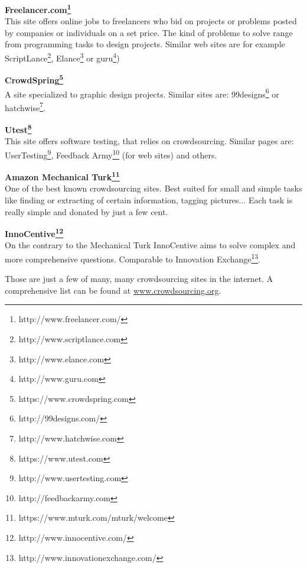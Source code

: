 \documentclass{acm_proc_article-sp}
\begin{document}
\textbf{Freelancer.com\footnote{http://www.freelancer.com/}}\\
This site offers online jobs to freelancers who bid on projects or problems posted by companies or individuals on a set price. The kind of problems to solve range from programming tasks to design projects. Similar web sites are for example ScriptLance\footnote{http://www.scriptlance.com}, Elance\footnote{http://www.elance.com} or guru\footnote{http://www.guru.com})

\textbf{CrowdSpring\footnote{https://www.crowdspring.com}}\\
A site specialized to graphic design projects. Similar sites are: 99designs\footnote{http://99designs.com/} or hatchwise\footnote{http://www.hatchwise.com}.

\textbf{Utest\footnote{https://www.utest.com}}\\
This site offers software testing, that relies on crowdsourcing. Similar pages are: UserTesting\footnote{http://www.usertesting.com}, Feedback Army\footnote{http://feedbackarmy.com} (for web sites) and others.

\textbf{Amazon Mechanical Turk\footnote{https://www.mturk.com/mturk/welcome}}\\
One of the best known crowdsourcing sites. Best suited for small and simple tasks like finding or extracting of certain information, tagging pictures... Each task is really simple and donated by just a few cent.

\textbf{InnoCentive\footnote{http://www.innocentive.com/}}\\
On the contrary to the Mechanical Turk InnoCentive aims to solve complex and more comprehensive questions. Comparable to Innovation Exchange\footnote{http://www.innovationexchange.com/}.

Those are just a few of many, many crowdsourcing sites in the internet. A comprehensive list can be found at \href{http://www.crowdsourcing.org/directory}{www.crowdsourcing.org}.
\end{document}
